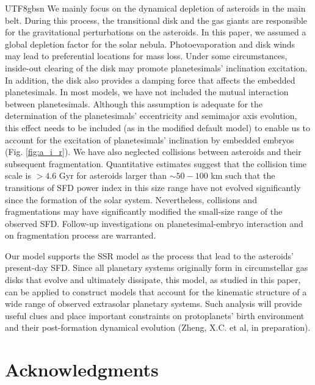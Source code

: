 \documentclass[tighten]{aastex6}
\begin{document}
\begin{CJK*}{UTF8}{gbsn}
We mainly focus on the dynamical depletion of asteroids in the main belt. 
During this process, the transitional disk and the gas giants are 
responsible for the gravitational perturbations on the asteroids. 
In this paper, we assumed a global depletion factor for the solar nebula.
Photoevaporation and disk winds may lead to preferential locations 
for mass loss.  Under some circumstances, inside-out clearing of the 
disk may promote planetesimals' inclination excitation.  In addition, 
the disk also provides a damping force that affects the embedded 
planetesimals. In most models, we have not included the mutual interaction 
between planetesimals. Although this assumption is adequate for the 
determination of the planetesimals' eccentricity and semimajor axis 
evolution, this effect needs to be included (as in the modified default 
model) to enable us to account for the excitation of planetesimals' 
inclination by embedded embryos (Fig. \ref{fig:a_i_r}).  We have also 
neglected collisions between asteroids and their subsequent fragmentation.  
Quantitative estimates suggest that 
the collision time scale is $>4.6$ Gyr for asteroids larger than $\sim 50-100$ 
km such that the transitions of SFD power index in this size range have not
evolved significantly since the formation of the solar system.  Nevertheless, 
collisions and fragmentations may have significantly modified the small-size 
range of the observed SFD. Follow-up investigations on planetesimal-embryo
interaction and on fragmentation process are warranted.

Our model supports the SSR model as the process that lead to the asteroids' present-day SFD. Since all planetary systems originally form in circumstellar gas disks that evolve and ultimately dissipate, 
this model, as studied in this paper, can be applied to construct models that
account for the kinematic structure of a wide range of observed extrasolar
planetary systems.  Such analysis will provide useful clues and place
important constraints on protoplanets' birth environment and their 
post-formation dynamical evolution (Zheng, X.C. et al, in preparation). 




\section*{Acknowledgments}


\end{CJK*}
\end{document}
